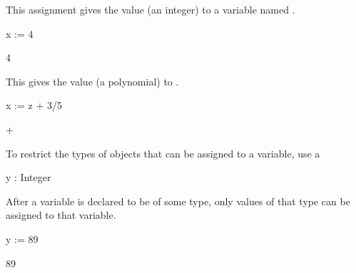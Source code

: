 {{{{{{{{\begin{xtc}
\begin{xtccomment}
This assignment gives the value  (an integer) to
a variable named .
\end{xtccomment}
\begin{spadsrc}
x := 4
\end{spadsrc}
\begin{TeXOutput}
\begin{fricasmath}{2}
4%
\end{fricasmath}
\end{TeXOutput}
\end{xtc}
\begin{xtc}
\begin{xtccomment}
This gives the value  (a polynomial)  to .
\end{xtccomment}
\begin{spadsrc}
x := z + 3/5
\end{spadsrc}
\begin{TeXOutput}
\begin{fricasmath}{3}
+%
\end{fricasmath}
\end{TeXOutput}
\end{xtc}
\begin{xtc}
\begin{xtccomment}
To restrict the types of objects that can be assigned to a variable,
use a 
\end{xtccomment}
\begin{spadsrc}
y : Integer 
\end{spadsrc}
\end{xtc}
\begin{xtc}
\begin{xtccomment}
After a variable is declared to be of some type, only values
of that type can be assigned to that variable.
\end{xtccomment}
\begin{spadsrc}
y := 89
\end{spadsrc}
\begin{TeXOutput}
\begin{fricasmath}{5}
89%
\end{fricasmath}
\end{TeXOutput}
\end{xtc}
\begin{xtc}

\end{xtc}}}}}}}}}
